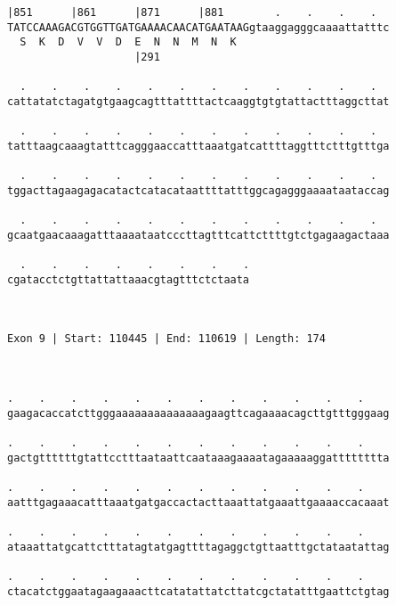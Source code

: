 \documentclass{article}
\begin{document}
\begin{Verbatim}
|851      |861      |871      |881        .    .    .    .  
TATCCAAAGACGTGGTTGATGAAAACAACATGAATAAGgtaaggagggcaaaattatttc
  S  K  D  V  V  D  E  N  N  M  N  K                        
                    |291                                    
  
  .    .    .    .    .    .    .    .    .    .    .    .  
cattatatctagatgtgaagcagtttattttactcaaggtgtgtattactttaggcttat
                                                            
  .    .    .    .    .    .    .    .    .    .    .    .  
tatttaagcaaagtatttcagggaaccatttaaatgatcattttaggtttctttgtttga
                                                            
  .    .    .    .    .    .    .    .    .    .    .    .  
tggacttagaagagacatactcatacataattttatttggcagagggaaaataataccag
                                                            
  .    .    .    .    .    .    .    .    .    .    .    .  
gcaatgaacaaagatttaaaataatcccttagtttcattcttttgtctgagaagactaaa
                                                            
  .    .    .    .    .    .    .    .
cgatacctctgttattattaaacgtagtttctctaata
                                      
                                      
 
Exon 9 | Start: 110445 | End: 110619 | Length: 174



.    .    .    .    .    .    .    .    .    .    .    .    
gaagacaccatcttgggaaaaaaaaaaaaaagaagttcagaaaacagcttgtttgggaag
                                                            
.    .    .    .    .    .    .    .    .    .    .    .    
gactgttttttgtattcctttaataattcaataaagaaaatagaaaaaggatttttttta
                                                            
.    .    .    .    .    .    .    .    .    .    .    .    
aatttgagaaacatttaaatgatgaccactacttaaattatgaaattgaaaaccacaaat
                                                            
.    .    .    .    .    .    .    .    .    .    .    .    
ataaattatgcattctttatagtatgagttttagaggctgttaatttgctataatattag
                                                            
.    .    .    .    .    .    .    .    .    .    .    .    
ctacatctggaatagaagaaacttcatatattatcttatcgctatatttgaattctgtag
                                                            

\end{Verbatim}
\end{document}
